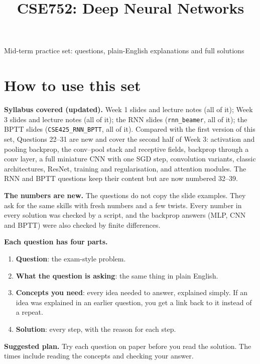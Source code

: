 \documentclass[12pt,a4paper]{article}
\title{CSE752: Deep Neural Networks}
\author{}
\date{}
\begin{document}
\maketitle
\begin{center}
{\Large Mid-term practice set: questions, plain-English explanations and full solutions}
\end{center}
\tableofcontents
\newpage

\section{How to use this set}

\textbf{Syllabus covered (updated).} Week 1 slides and lecture notes (all of it); Week 3 slides and lecture notes (all of it); the RNN slides (\texttt{rnn\_beamer}, all of it); the BPTT slides (\texttt{CSE425\_RNN\_BPTT}, all of it). Compared with the first version of this set, Questions 22--31 are new and cover the second half of Week 3: activation and pooling backprop, the conv--pool stack and receptive fields, backprop through a conv layer, a full miniature CNN with one SGD step, convolution variants, classic architectures, ResNet, training and regularisation, and attention modules. The RNN and BPTT questions keep their content but are now numbered 32--39.

\textbf{The numbers are new.} The questions do not copy the slide examples. They ask for the same skills with fresh numbers and a few twists. Every number in every solution was checked by a script, and the backprop answers (MLP, CNN and BPTT) were also checked by finite differences.

\textbf{Each question has four parts.}
\begin{enumerate}[nosep]
\item \textbf{Question}: the exam-style problem.
\item \textbf{What the question is asking}: the same thing in plain English.
\item \textbf{Concepts you need}: every idea needed to answer, explained simply. If an idea was explained in an earlier question, you get a link back to it instead of a repeat.
\item \textbf{Solution}: every step, with the reason for each step.
\end{enumerate}

\textbf{Suggested plan.} Try each question on paper before you read the solution. The times include reading the concepts and checking your answer.
\end{document}
